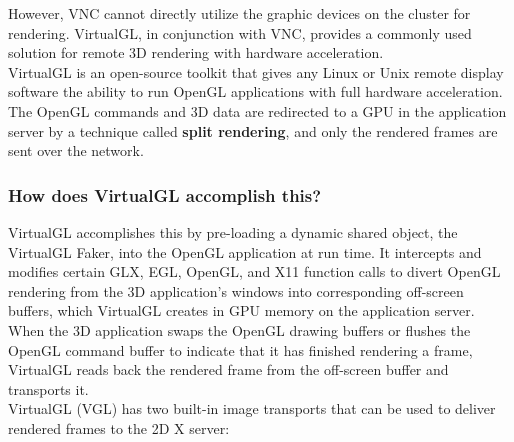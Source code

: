 \documentclass[a4paper,12pt, final]{report}
\begin{document}
\noindent However, VNC cannot directly utilize the graphic devices on the cluster for rendering. VirtualGL, in conjunction with VNC, provides a commonly used solution for remote 3D rendering with hardware acceleration.\\

\noindent VirtualGL is an open-source toolkit that gives any Linux or Unix remote display software the ability to run OpenGL applications with full hardware acceleration. The OpenGL commands and 3D data are redirected to a GPU in the application server by a technique called \textbf{split rendering}, and only the rendered frames are sent over the network.

\subsubsection{How does VirtualGL accomplish this?}
VirtualGL accomplishes this by pre-loading a dynamic shared object, the VirtualGL Faker, into the OpenGL application at run time. It intercepts and modifies certain GLX, EGL, OpenGL, and X11 function calls to divert OpenGL rendering from the 3D application's windows into corresponding off-screen buffers, which VirtualGL creates in GPU memory on the application server. When the 3D application swaps the OpenGL drawing buffers or flushes the OpenGL command buffer to indicate that it has finished rendering a frame, VirtualGL reads back the rendered frame from the off-screen buffer and transports it.\\

\noindent VirtualGL (VGL) has two built-in image transports that can be used to deliver rendered frames to the 2D X server:
\end{document}
